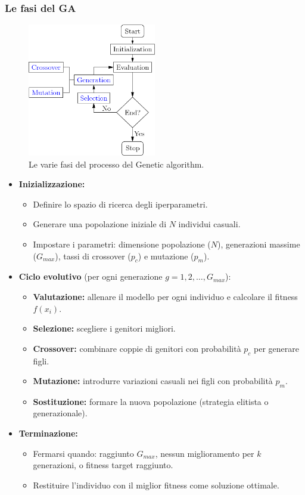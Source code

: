 \documentclass[a4paper,12pt]{report}
\begin{document}
	\subsubsection{Le fasi del GA}
	\begin{figure}[H]
		\centering
		\includegraphics[width=0.5\textwidth]{img/ga_process.png}
		\caption{Le varie fasi del processo del Genetic algorithm.}
	\end{figure}
	\begin{itemize}
		\item \textbf{Inizializzazione:}
		\begin{itemize}
			\item Definire lo spazio di ricerca degli iperparametri.
			\item Generare una popolazione iniziale di $N$ individui casuali.
			\item Impostare i parametri: dimensione popolazione ($N$), generazioni massime ($G_{max}$), tassi di crossover ($p_c$) e mutazione ($p_m$).
		\end{itemize}
		
		\item \textbf{Ciclo evolutivo} (per ogni generazione $g = 1, 2, \ldots, G_{max}$):
		\begin{itemize}
			\item \textbf{Valutazione:} allenare il modello per ogni individuo e calcolare il fitness $f(x_i)$.
			\item \textbf{Selezione:} scegliere i genitori migliori.
			\item \textbf{Crossover:} combinare coppie di genitori con probabilità $p_c$ per generare figli.
			\item \textbf{Mutazione:} introdurre variazioni casuali nei figli con probabilità $p_m$.
			\item \textbf{Sostituzione:} formare la nuova popolazione (strategia elitista o generazionale).
		\end{itemize}
		
		\item \textbf{Terminazione:}
		\begin{itemize}
			\item Fermarsi quando: raggiunto $G_{max}$, nessun miglioramento per $k$ generazioni, o fitness target raggiunto.
			\item Restituire l'individuo con il miglior fitness come soluzione ottimale.
		\end{itemize}
	\end{itemize}
	
\end{document}
